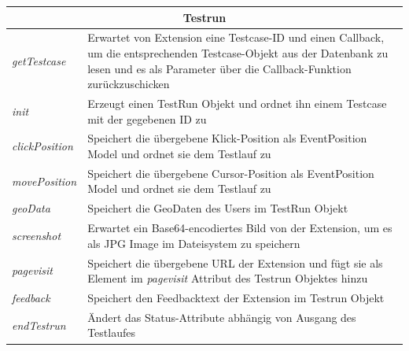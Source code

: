 {\footnotesize
\begin{tabular}{ p{3cm} p{11.5cm} }
  \hline
  \multicolumn{2}{c}{\textbf{Testrun}} \\
  \hline
  \textit{getTestcase} & Erwartet von Extension eine Testcase-ID und einen Callback, um die entsprechenden Testcase-Objekt aus der Datenbank zu lesen und es als Parameter über die Callback-Funktion zurückzuschicken\vspace{0.2cm}\\
  \textit{init} & Erzeugt einen TestRun Objekt und ordnet ihn einem Testcase mit der gegebenen ID zu\vspace{0.2cm}\\
  \textit{clickPosition} & Speichert die übergebene Klick-Position als EventPosition Model und ordnet sie dem Testlauf zu\vspace{0.2cm}\\
  \textit{movePosition} & Speichert die übergebene Cursor-Position als EventPosition Model und ordnet sie dem Testlauf zu\vspace{0.2cm}\\
  \textit{geoData} & Speichert die GeoDaten des Users im TestRun Objekt\vspace{0.2cm}\\
  \textit{screenshot} & Erwartet ein Base64-encodiertes Bild von der Extension, um es als JPG Image im Dateisystem zu speichern\vspace{0.2cm}\\
  \textit{pagevisit} & Speichert die übergebene URL der Extension und fügt sie als Element im \textit{pagevisit} Attribut des Testrun Objektes hinzu\vspace{0.2cm}\\
  \textit{feedback} & Speichert den Feedbacktext der Extension im Testrun Objekt\vspace{0.2cm}\\
  \textit{endTestrun} & Ändert das Status-Attribute abhängig von Ausgang des Testlaufes\vspace{0.2cm}\\
  \hline
\end{tabular}
}